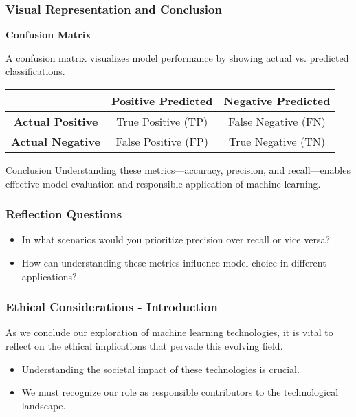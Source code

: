 \documentclass[aspectratio=169]{beamer}
\begin{document}
\begin{frame}[fragile]
    \frametitle{Visual Representation and Conclusion}
    \textbf{Confusion Matrix}
    \begin{block}{}
    A confusion matrix visualizes model performance by showing actual vs. predicted classifications.
    \end{block}
    \begin{tabular}{|c|c|c|}
        \hline
        & \textbf{Positive Predicted} & \textbf{Negative Predicted} \\
        \hline
        \textbf{Actual Positive} & True Positive (TP) & False Negative (FN) \\
        \hline
        \textbf{Actual Negative} & False Positive (FP) & True Negative (TN) \\
        \hline
    \end{tabular}

    \begin{block}{Conclusion}
    Understanding these metrics—accuracy, precision, and recall—enables effective model evaluation and responsible application of machine learning.
    \end{block}
\end{frame}

\begin{frame}[fragile]
    \frametitle{Reflection Questions}
    \begin{itemize}
        \item In what scenarios would you prioritize precision over recall or vice versa?
        \item How can understanding these metrics influence model choice in different applications?
    \end{itemize}
\end{frame}

\begin{frame}[fragile]
    \frametitle{Ethical Considerations - Introduction}
    As we conclude our exploration of machine learning technologies, it is vital to reflect on the ethical implications that pervade this evolving field.  
    \begin{itemize}
        \item Understanding the societal impact of these technologies is crucial.
        \item We must recognize our role as responsible contributors to the technological landscape.
    \end{itemize}
\end{frame}
\end{document}
